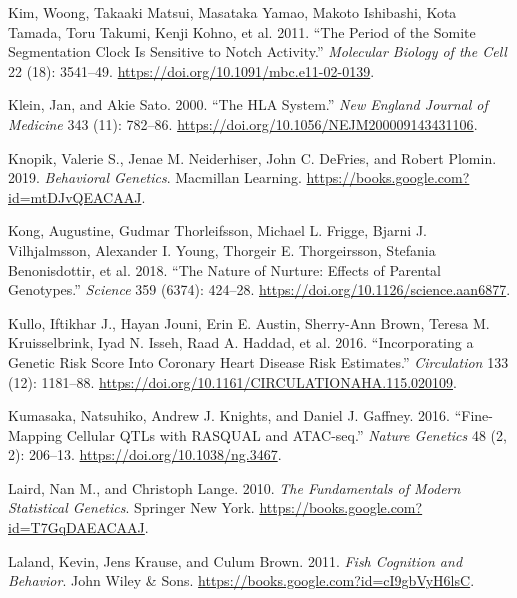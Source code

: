 \documentclass[
]{book}
\newlength{\cslhangindent}
\newlength{\cslentryspacingunit} %
\newenvironment{CSLReferences}[2] %
 {%
  \setlength{\parindent}{0pt}
  \ifodd #1
  \let\oldpar\par
  \def\par{\hangindent=\cslhangindent\oldpar}
  \fi
  \setlength{\parskip}{#2\cslentryspacingunit}
 }%
 {}
\begin{document}
\begin{CSLReferences}{1}{0}
\leavevmode{}%
Kim, Woong, Takaaki Matsui, Masataka Yamao, Makoto Ishibashi, Kota Tamada, Toru Takumi, Kenji Kohno, et al. 2011. {``The Period of the Somite Segmentation Clock Is Sensitive to {Notch} Activity.''} \emph{Molecular Biology of the Cell} 22 (18): 3541--49. \url{https://doi.org/10.1091/mbc.e11-02-0139}.

\leavevmode{}%
Klein, Jan, and Akie Sato. 2000. {``The {HLA System}.''} \emph{New England Journal of Medicine} 343 (11): 782--86. \url{https://doi.org/10.1056/NEJM200009143431106}.

\leavevmode{}%
Knopik, Valerie S., Jenae M. Neiderhiser, John C. DeFries, and Robert Plomin. 2019. \emph{Behavioral {Genetics}}. {Macmillan Learning}. \url{https://books.google.com?id=mtDJvQEACAAJ}.

\leavevmode{}%
Kong, Augustine, Gudmar Thorleifsson, Michael L. Frigge, Bjarni J. Vilhjalmsson, Alexander I. Young, Thorgeir E. Thorgeirsson, Stefania Benonisdottir, et al. 2018. {``The Nature of Nurture: {Effects} of Parental Genotypes.''} \emph{Science} 359 (6374): 424--28. \url{https://doi.org/10.1126/science.aan6877}.

\leavevmode{}%
Kullo, Iftikhar J., Hayan Jouni, Erin E. Austin, Sherry-Ann Brown, Teresa M. Kruisselbrink, Iyad N. Isseh, Raad A. Haddad, et al. 2016. {``Incorporating a {Genetic Risk Score Into Coronary Heart Disease Risk Estimates}.''} \emph{Circulation} 133 (12): 1181--88. \url{https://doi.org/10.1161/CIRCULATIONAHA.115.020109}.

\leavevmode{}%
Kumasaka, Natsuhiko, Andrew J. Knights, and Daniel J. Gaffney. 2016. {``Fine-Mapping Cellular {QTLs} with {RASQUAL} and {ATAC-seq}.''} \emph{Nature Genetics} 48 (2, 2): 206--13. \url{https://doi.org/10.1038/ng.3467}.

\leavevmode{}%
Laird, Nan M., and Christoph Lange. 2010. \emph{The {Fundamentals} of {Modern Statistical Genetics}}. {Springer New York}. \url{https://books.google.com?id=T7GqDAEACAAJ}.

\leavevmode{}%
Laland, Kevin, Jens Krause, and Culum Brown. 2011. \emph{Fish {Cognition} and {Behavior}}. {John Wiley \& Sons}. \url{https://books.google.com?id=cI9gbVyH6lsC}.


\end{CSLReferences}
\end{document}
